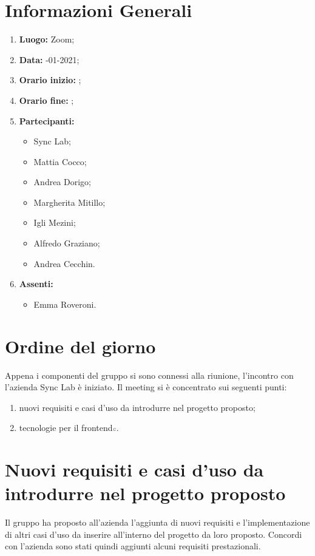 \newpage
\section{Informazioni Generali}
\begin{enumerate}
	\item \textbf{Luogo:} \normalfont Zoom;
	\item \textbf{Data:} -01-2021;
	\item \textbf{Orario inizio:} ;
	\item \textbf{Orario fine:} ;
	\item \textbf{Partecipanti:}
	\begin{itemize}
		\item Sync Lab;
		\item Mattia Cocco;
		\item Andrea Dorigo;
		\item Margherita Mitillo;
		\item Igli Mezini;
		\item Alfredo Graziano;
		\item Andrea Cecchin.
	\end{itemize}
	\item \textbf{Assenti:}
	\begin{itemize}
		\item Emma Roveroni.
	\end{itemize}
\end{enumerate}
\section{Ordine del giorno}
Appena i componenti del gruppo si sono connessi alla riunione, l'incontro con l'azienda Sync Lab è iniziato.
Il meeting si è concentrato sui seguenti punti:
\begin{enumerate}
	\item nuovi requisiti e casi d'uso da introdurre nel progetto proposto;
	\item tecnologie per il frontend${\scaleto{G}{3pt}}$.
\end{enumerate}
\section{Nuovi requisiti e casi d'uso da introdurre nel progetto proposto}
Il gruppo ha proposto all'azienda l'aggiunta di nuovi requisiti e l'implementazione di altri casi d'uso da inserire all'interno del progetto da loro proposto.
Concordi con l'azienda sono stati quindi aggiunti alcuni requisiti prestazionali.

